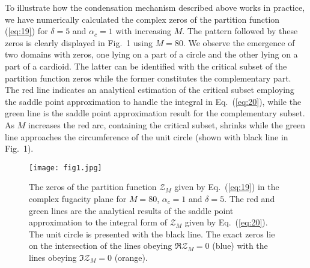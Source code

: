 \documentclass[aps,pre,showpacs,amsmath,amssymb,superscriptaddress,twocolumn]{revtex4-1}
\begin{document}
To illustrate how the condensation mechanism described above works in practice, we have numerically calculated the complex zeros of the partition function (\ref{eq:19}) for $\delta = 5$ and $\alpha_c=1$ with increasing $M$. The pattern followed by these zeros is clearly displayed in Fig.~1 using $M=80$. We observe the emergence of two domains with zeros, one lying on a part of a circle and the other lying on a part of a cardioid. The latter can be identified with the critical subset of the partition function zeros while the former constitutes the complementary part. The red line indicates an analytical estimation of the critical subset employing the saddle point approximation to handle the integral in Eq.~(\ref{eq:20}), while the green line is the saddle point approximation result for the complementary subset. As $M$ increases the red arc, containing the critical subset, shrinks while the green line approaches the circumference of the unit circle (shown with black line in Fig.~1). 

\begin{figure}[tbp]
\centering
\texttt{[image: fig1.jpg]}
\caption{The zeros of the partition function $\mathcal{Z}_M$ given by Eq.~(\ref{eq:19}) in the complex fugacity plane for $M=80$, 
$\alpha_c=1$ and $\delta=5$. The red and green lines are the analytical results of the saddle point approximation to the integral form of $\mathcal{Z}_M$ given by Eq.~(\ref{eq:20}). The unit circle is presented with the black line. The exact zeros lie on the intersection of the lines obeying $\Re{\mathcal{Z}_M}=0$ (blue) with the lines obeying $\Im{\mathcal{Z}_M}=0$ (orange).}
\label{fig:roots}
\end{figure}   
\end{document}
